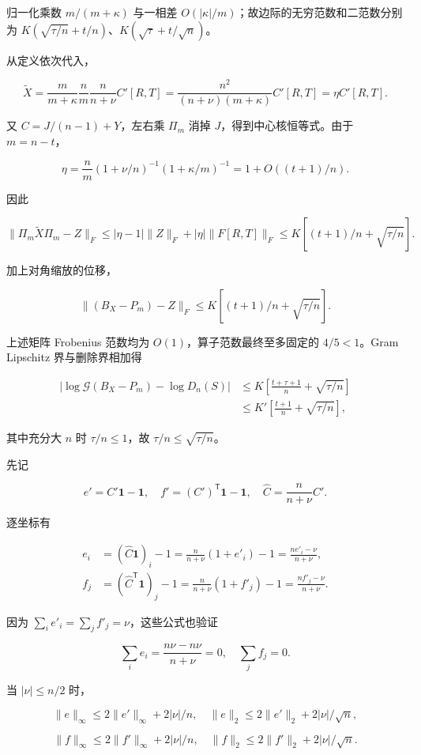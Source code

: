 \documentclass[11pt,a4paper]{article}
\begin{document}
归一化乘数 \(m/(m+\kappa)\) 与一相差 \(O(|\kappa|/m)\)；故边际的无穷范数和二范数分别为 \(K(\sqrt{\tau/n}+t/n)\)、\(K(\sqrt\tau+t/\sqrt n)\)。

从定义依次代入，

\[
\widetilde X=\frac m{m+\kappa}\frac nm\frac n{n+\nu}C'[R,T]
=\frac{n^2}{(n+\nu)(m+\kappa)}C'[R,T]=\eta C'[R,T].
\]

又 \(C=J/(n-1)+Y\)，左右乘 \(\Pi_m\) 消掉 \(J\)，得到中心核恒等式。由于 \(m=n-t\)，

\[
\eta=\frac nm(1+\nu/n)^{-1}(1+\kappa/m)^{-1}
=1+O((t+1)/n).
\]

因此

\[
\|\Pi_m\widetilde X\Pi_m-Z\|_F
\le|\eta-1|\|Z\|_F+|\eta|\|F[R,T]\|_F
\le K[(t+1)/n+\sqrt{\tau/n}].
\]

加上对角缩放的位移，

\[
\|(B_X-P_m)-Z\|_F
\le K[(t+1)/n+\sqrt{\tau/n}].
\]

上述矩阵 Frobenius 范数均为 \(O(1)\)，算子范数最终至多固定的 \(4/5<1\)。Gram Lipschitz 界与删除界相加得

\[
\begin{aligned}
|\log\mathcal G(B_X-P_m)-\log D_n(S)|
&\le K\left[\frac{t+\tau+1}n+\sqrt{\tau/n}\right]\\
&\le K'\left[\frac{t+1}n+\sqrt{\tau/n}\right],
\end{aligned}
\]

其中充分大 \(n\) 时 \(\tau/n\le1\)，故 \(\tau/n\le\sqrt{\tau/n}\)。

先记

\[
e'=C'\mathbf1-\mathbf1,\quad
f'=(C')^{\mathsf T}\mathbf1-\mathbf1,\quad
\widehat C=\frac n{n+\nu}C'.
\]

逐坐标有

\[
\begin{aligned}
e_i&=(\widehat C\mathbf1)_i-1
=\frac n{n+\nu}(1+e'_i)-1
=\frac{ne'_i-\nu}{n+\nu},\\
f_j&=(\widehat C^{\mathsf T}\mathbf1)_j-1
=\frac n{n+\nu}(1+f'_j)-1
=\frac{nf'_j-\nu}{n+\nu}.
\end{aligned}
\]

因为 \(\sum_ie'_i=\sum_jf'_j=\nu\)，这些公式也验证

\[
\sum_ie_i=\frac{n\nu-n\nu}{n+\nu}=0,\quad
\sum_jf_j=0.
\]

当 \(|\nu|\le n/2\) 时，

\[
\|e\|_\infty\le2\|e'\|_\infty+2|\nu|/n,\quad
\|e\|_2\le2\|e'\|_2+2|\nu|/\sqrt n,
\]

\[
\|f\|_\infty\le2\|f'\|_\infty+2|\nu|/n,\quad
\|f\|_2\le2\|f'\|_2+2|\nu|/\sqrt n.
\]
\end{document}
